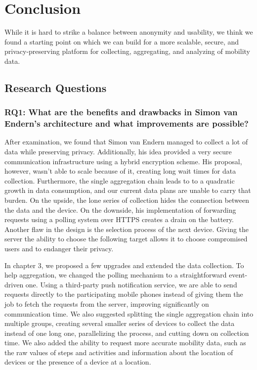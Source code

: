 
\chapter{Conclusion}\label{chapter:conclusion}
While it is hard to strike a balance between anonymity and usability, we think we found a starting point on which we can build for a more scalable, secure, and privacy-preserving platform for collecting, aggregating, and analyzing of mobility data.

\section{Research Questions}
\subsection*{RQ1: What are the benefits and drawbacks in Simon van Endern's architecture and what improvements are possible?}
After examination, we found that Simon van Endern managed to collect a lot of data while preserving privacy. Additionally, his idea provided a very secure communication infrastructure using a hybrid encryption scheme. His proposal, however, wasn't able to scale because of it, creating long wait times for data collection.
Furthermore, the single aggregation chain leads to to a quadratic growth in data consumption, and our current data plans are unable to carry that burden. On the upside, the lone series of collection hides the connection between the data and the device. On the downside, his implementation of forwarding requests using a polling system over HTTPS creates a drain on the battery.
Another flaw in the design is the selection process of the next device. Giving the server the ability to choose the following target allows it to choose compromised users and to endanger their privacy. 

In chapter 3, we proposed a few upgrades and extended the data collection. To help aggregation, we changed the polling mechanism to a straightforward event-driven one. Using a third-party push notification service, we are able to send requests directly to the participating mobile phones instead of giving them the job to fetch the requests from the server, improving significantly on communication time. We also suggested splitting the single aggregation chain into multiple groups, creating several smaller series of devices to collect the data instead of one long one, parallelizing the process, and cutting down on collection time. We also added the ability to request more accurate mobility data, such as the raw values of steps and activities and information about the location of devices or the presence of a device at a location. 

